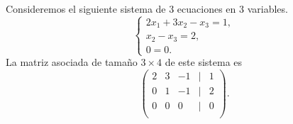 \documentclass[12pt,a4paper]{book}
\begin{document}
    \begin{ejemplo}
        Consideremos el siguiente sistema de 3 ecuaciones en 3 variables.
        \begin{equation*}
            \begin{cases}
                2x_1 + 3x_2 - x_3 = 1,\\
                x_2 - x_3 = 2,\\
                0 = 0.
            \end{cases}
        \end{equation*}
        La matriz asociada de tamaño $3 \times 4$ de este sistema es
        \begin{equation*}
            \begin{pmatrix}
                2 & 3 & -1 & | & 1\\
                0 & 1 & -1 & | & 2\\
                0 & 0 & 0 & | & 0\\
            \end{pmatrix}.
        \end{equation*}
    \end{ejemplo}
\end{document}
